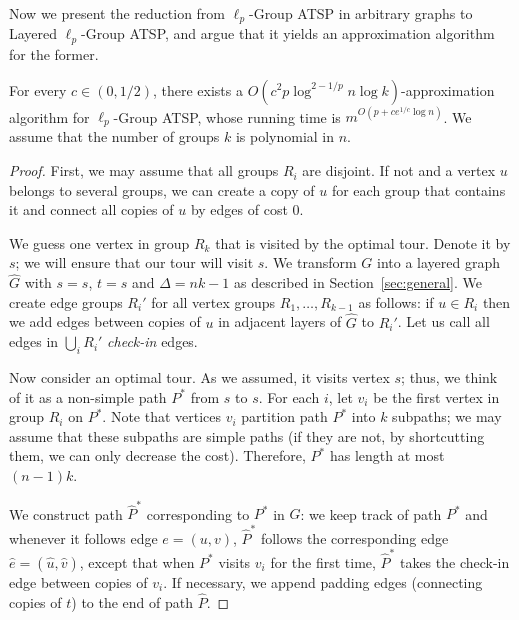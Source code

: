\documentclass[11pt,a4paper]{article}
\begin{document}
Now we present the reduction from $\ell_p$-Group ATSP in arbitrary graphs to Layered $\ell_p$-Group ATSP, and argue that it yields an approximation algorithm for the former.
\begin{theorem}
For every $c\in (0,1/2)$, there exists a $O(c^2 p  \log^{2-1/p} n \log k)$-approximation algorithm for $\ell_p$-Group ATSP, whose running time is $m^{O(p+ce^{1/c} \log n)}$. We assume that the number of groups $k$ is polynomial in $n$. 
\end{theorem}
\begin{proof}
First, we may assume that all groups $R_i$ are disjoint. If not and a vertex $u$ belongs to several groups, we can create a copy of $u$ for each group that contains it and connect all copies of $u$ by edges of cost 0. 

We guess one vertex in group $R_k$ that is visited by the optimal tour. Denote it by $s$; we will ensure that our tour will visit $s$. We transform $G$ into a layered graph $\hat G$ with $s=s$, $t=s$ and $\Delta = nk -1$ as described in Section~\ref{sec:general}. We create edge groups $R_i'$ for all vertex groups $R_1,\dots, R_{k-1}$ as follows: if $u\in R_i$ then we add edges between copies of $u$ in adjacent layers of $\hat G$ to $R_i'$. Let us call all edges in $\bigcup_i R_i'$ \textit{check-in} edges. 

Now consider an optimal tour. As we assumed, it visits vertex $s$; thus, we think of it as a non-simple path $P^*$ from $s$ to $s$. For each $i$, let $v_i$ be the first vertex in group $R_i$ on $P^*$. Note that vertices $v_i$ partition path $P^*$ into $k$ subpaths; we may assume that these subpaths are simple paths (if they are not, by shortcutting them, we can only decrease the cost). Therefore, $P^*$ has length at most $(n-1)k$.

We construct path $\hat P^*$ corresponding to $P^*$ in $\hat G$: we keep track of path $P^*$ and whenever it follows edge $e=(u,v)$, $\hat P^*$ follows the corresponding edge $\hat e = (\hat u, \hat v)$, except that when $P^*$ visits $v_i$ for the first time, $\hat P^*$ takes the check-in edge between copies of $v_i$. If necessary, we append padding edges (connecting copies of $t$) to the end of path $\hat P$.


\end{proof}
\end{document}
